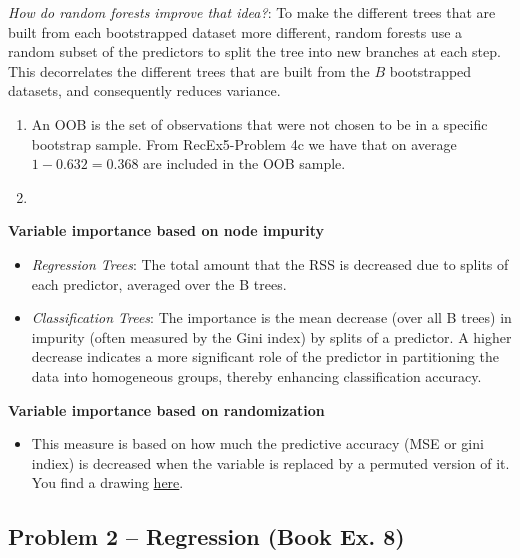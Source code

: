 \documentclass[
]{article}
\providecommand{\tightlist}{%
  \setlength{\itemsep}{0pt}\setlength{\parskip}{0pt}}
\begin{document}
\emph{How do random forests improve that idea?}: To make the different
trees that are built from each bootstrapped dataset more different,
random forests use a random subset of the predictors to split the tree
into new branches at each step. This decorrelates the different trees
that are built from the \(B\) bootstrapped datasets, and consequently
reduces variance.

\begin{enumerate}
\def\labelenumi{\alph{enumi})}
\setcounter{enumi}{3}
\item
  An OOB is the set of observations that were not chosen to be in a
  specific bootstrap sample. From RecEx5-Problem 4c we have that on
  average \(1-0.632 = 0.368\) are included in the OOB sample.
\item
\end{enumerate}

\textbf{Variable importance based on node impurity}

\begin{itemize}
\tightlist
\item
  \emph{Regression Trees}: The total amount that the RSS is decreased
  due to splits of each predictor, averaged over the B trees.
\item
  \emph{Classification Trees}: The importance is the mean decrease (over
  all B trees) in impurity (often measured by the Gini index) by splits
  of a predictor. A higher decrease indicates a more significant role of
  the predictor in partitioning the data into homogeneous groups,
  thereby enhancing classification accuracy.
\end{itemize}

\textbf{Variable importance based on randomization}

\begin{itemize}
\tightlist
\item
  This measure is based on how much the predictive accuracy (MSE or gini
  indiex) is decreased when the variable is replaced by a permuted
  version of it. You find a drawing
  \href{https://github.com/stefaniemuff/statlearning/blob/master/8Trees/M8_variableImportanceRandomization.pdf}{here}.
\end{itemize}

\subsection{Problem 2 -- Regression (Book Ex.
8)}\label{problem-2-regression-book-ex.-8}
\end{document}
